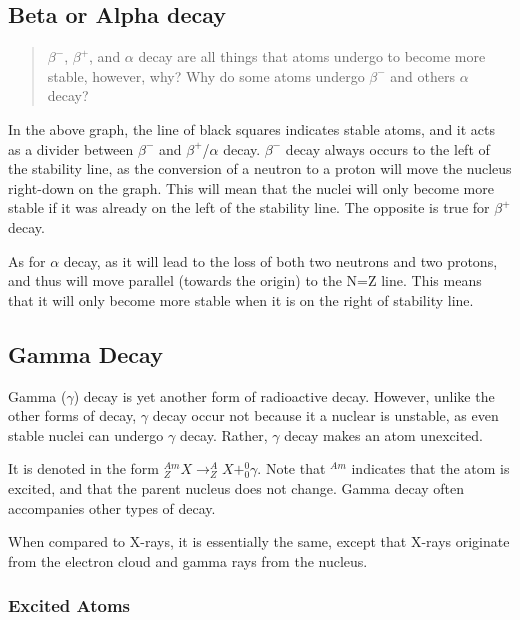 \documentclass[
]{article}
\begin{document}
\hypertarget{beta-or-alpha-decay}{%
\subsection{Beta or Alpha decay}\label{beta-or-alpha-decay}}

\begin{quote}
{\(\beta^{-}\)}, {\(\beta^{+}\)}, and {\(\alpha\)} decay are all things
that atoms undergo to become more stable, however, why? Why do some
atoms undergo {\(\beta^{-}\)} and others {\(\alpha\)} decay?
\end{quote}

In the above graph, the line of black squares indicates stable atoms,
and it acts as a divider between {\(\beta^{-}\)} and
{\(\beta^{+}\)}/{\(\alpha\)} decay. {\(\beta^{-}\)} decay always occurs
to the left of the stability line, as the conversion of a neutron to a
proton will move the nucleus right-down on the graph. This will mean
that the nuclei will only become more stable if it was already on the
left of the stability line. The opposite is true for {\(\beta^{+}\)}
decay.

As for {\(\alpha\)} decay, as it will lead to the loss of both two
neutrons and two protons, and thus will move parallel (towards the
origin) to the N=Z line. This means that it will only become more stable
when it is on the right of stability line.

\hypertarget{gamma-decay}{%
\subsection{Gamma Decay}\label{gamma-decay}}

Gamma ({\(\gamma\)}) decay is yet another form of radioactive decay.
However, unlike the other forms of decay, {\(\gamma\)} decay occur not
because it a nuclear is unstable, as even stable nuclei can undergo
{\(\gamma\)} decay. Rather, {\(\gamma\)} decay makes an atom unexcited.

It is denoted in the form
{\(_{Z}^{Am}X \rightarrow_{Z}^{A}X +_{0}^{0}\gamma\)}. Note that
{\(^{Am}\)} indicates that the atom is excited, and that the parent
nucleus does not change. Gamma decay often accompanies other types of
decay.

When compared to X-rays, it is essentially the same, except that X-rays
originate from the electron cloud and gamma rays from the nucleus.

\hypertarget{excited-atoms}{%
\subsubsection{Excited Atoms}\label{excited-atoms}}
\end{document}
